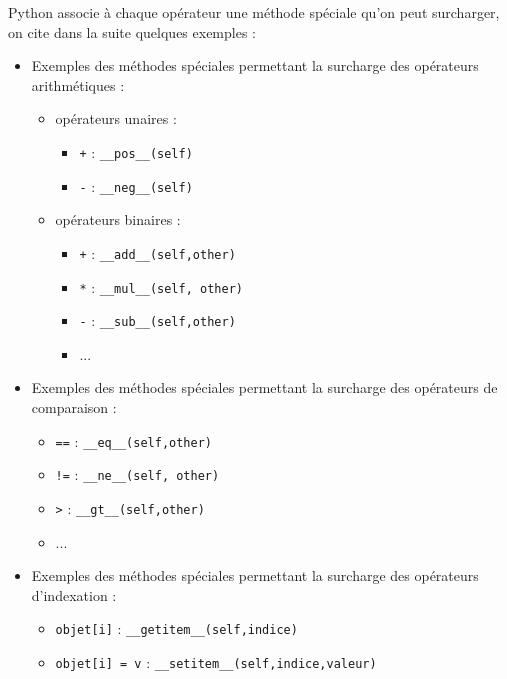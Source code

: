 \documentclass[a4paper,11pt]{article}
\theoremstyle{mytheor}
\begin{document}
Python associe à chaque opérateur une méthode spéciale qu'on peut surcharger, on cite dans la suite quelques
exemples :
\begin{itemize}
	\item Exemples des méthodes spéciales permettant la surcharge des opérateurs arithmétiques :
	\begin{itemize}
		
		\item opérateurs unaires :
		\begin{itemize}
			
			\item \texttt{+} : \Verb!__pos__(self)!
			
			\item \texttt{-} : \Verb!__neg__(self)!
			
		\end{itemize}
		
		\noindent
		\item opérateurs binaires :
		\begin{itemize}
			
			\item \texttt{+} : \Verb!__add__(self,other)!
			
			\item \texttt{*} : \Verb!__mul__(self, other)!
			
			\item \texttt{-} : \Verb!__sub__(self,other)!
			
			\item ...
			
		\end{itemize}
		
		\noindent
	\end{itemize}
	
	\noindent
	\item Exemples des méthodes spéciales permettant la surcharge des opérateurs de comparaison :
	\begin{itemize}
		
		\item \texttt{==} : \Verb!__eq__(self,other)!
		
		\item \Verb?!=? : \Verb!__ne__(self, other)!
		
		\item \texttt{>} : \Verb!__gt__(self,other)!
		
		\item ...
		
	\end{itemize}
	
	\noindent
	\item Exemples des méthodes spéciales permettant la surcharge des opérateurs d'indexation :
	\begin{itemize}
		
		\item \texttt{objet[i]} : \Verb!__getitem__(self,indice)!
		
		\item \texttt{objet[i] = v} : \Verb!__setitem__(self,indice,valeur)!
	\end{itemize}
	
	\noindent
\end{itemize}
\end{document}
